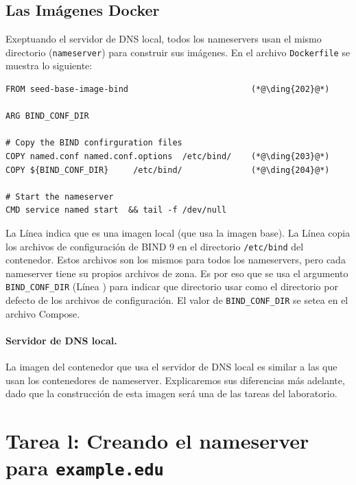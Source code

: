 \subsection{Las Imágenes Docker} 

Exeptuando el servidor de DNS local, todos los nameservers usan el mismo directorio (\texttt{nameserver}) para construir sus imágenes. En el archivo \texttt{Dockerfile} se muestra lo siguiente:


\begin{lstlisting}
FROM seed-base-image-bind                         (*@\ding{202}@*)

ARG BIND_CONF_DIR

# Copy the BIND confirguration files
COPY named.conf named.conf.options  /etc/bind/    (*@\ding{203}@*)
COPY ${BIND_CONF_DIR}     /etc/bind/              (*@\ding{204}@*)

# Start the nameserver
CMD service named start  && tail -f /dev/null
\end{lstlisting}

La Línea  indica que es una imagen local (que usa la imagen base).
La Línea  copia los archivos de configuración de BIND 9 en el directorio  \texttt{/etc/bind} del contenedor. Estos archivos son los mismos para todos los nameservers, pero cada nameserver tiene su propios archivos de zona. Es por eso que se usa el argumento \texttt{BIND\_CONF\_DIR} (Línea ) para indicar que directorio usar como el directorio por defecto de los archivos de configuración. El valor de \texttt{BIND\_CONF\_DIR} se setea en el archivo Compose.


\paragraph{Servidor de DNS local.}
La imagen del contenedor que usa el servidor de DNS local es similar a las que usan los contenedores de nameserver. Explicaremos sus diferencias más adelante, dado que la construcción de esta imagen será una de las tareas del laboratorio.


\section{Tarea l: Creando el nameserver para \texttt{example.edu}}

